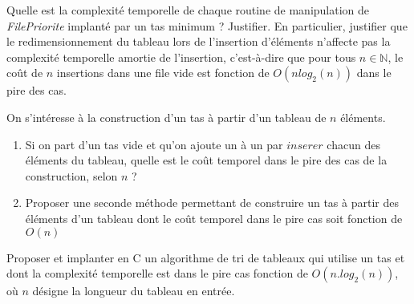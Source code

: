 \documentclass[../../../main.tex]{subfiles}
\begin{document}
 Quelle est la complexité temporelle de chaque routine de manipulation de \textit{FilePriorite} implanté par un tas minimum ? Justifier. En particulier, justifier que le redimensionnement du tableau lors de l'insertion d'éléments n'affecte pas la complexité temporelle amortie de l'insertion, c'est-à-dire que pour tous $n\in\mathbb{N}$, le coût de $n$ insertions dans une file vide est fonction de $O(nlog_2(n))$ dans le pire des cas.

 On s'intéresse à la construction d'un tas à partir d'un tableau de $n$ éléments.
\begin{enumerate}
	\item Si on part d'un tas vide et qu'on ajoute un à un par $inserer$ chacun des éléments du tableau, quelle est le coût temporel dans le pire des cas de la construction, selon $n$ ?
	\item Proposer une seconde méthode permettant de construire un tas à partir des éléments d'un tableau dont le coût temporel dans le pire cas soit fonction de $O(n)$
\end{enumerate}

Proposer et implanter en C un algorithme de tri de tableaux qui utilise un tas et dont la complexité temporelle est dans le pire cas fonction de $O(n.log_2(n))$, où $n$ désigne la longueur du tableau en entrée.
\end{document}

